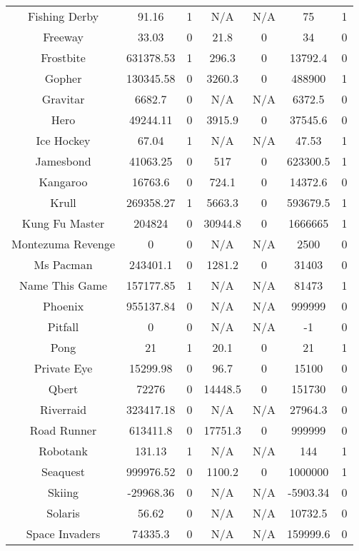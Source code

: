 \begin{table}[!hb]
\begin{center}
\begin{tabular}{c cc cc cc}
        Fishing Derby & 91.16 & 1  & N/A & N/A & 75 & 1  \\  
        Freeway & 33.03 & 0  & 21.8 & 0  & 34 & 0  \\  
        Frostbite & 631378.53 & 1  & 296.3 & 0  & 13792.4 & 0  \\  
        Gopher & 130345.58 & 0  & 3260.3 & 0  & 488900 & 1  \\  
        Gravitar & 6682.7 & 0  & N/A & N/A & 6372.5 & 0  \\  
        Hero & 49244.11 & 0  & 3915.9 & 0  & 37545.6 & 0  \\  
        Ice Hockey & 67.04 & 1  & N/A & N/A & 47.53 & 1  \\  
        Jamesbond & 41063.25 & 0  & 517 & 0  & 623300.5 & 1  \\  
        Kangaroo & 16763.6 & 0  & 724.1 & 0  & 14372.6 & 0  \\  
        Krull & 269358.27 & 1  & 5663.3 & 0  & 593679.5 & 1  \\  
        Kung Fu Master & 204824 & 0  & 30944.8 & 0  & 1666665 & 1  \\  
        Montezuma Revenge & 0 & 0  & N/A & N/A & 2500 & 0  \\  
        Ms Pacman & 243401.1 & 0  & 1281.2 & 0  & 31403 & 0  \\  
        Name This Game & 157177.85 & 1  & N/A & N/A & 81473 & 1  \\  
        Phoenix & 955137.84 & 0  & N/A & N/A & 999999 & 0  \\  
        Pitfall & 0 & 0  & N/A & N/A & -1 & 0  \\  
        Pong & 21 & 1  & 20.1 & 0  & 21 & 1  \\  
        Private Eye & 15299.98 & 0  & 96.7 & 0  & 15100 & 0  \\  
        Qbert & 72276 & 0  & 14448.5 & 0  & 151730 & 0  \\  
        Riverraid & 323417.18 & 0  & N/A & N/A & 27964.3 & 0  \\  
        Road Runner & 613411.8 & 0  & 17751.3 & 0  & 999999 & 0  \\  
        Robotank & 131.13 & 1  & N/A & N/A & 144 & 1  \\  
        Seaquest & 999976.52 & 0  & 1100.2 & 0  & 1000000 & 1  \\  
        Skiing & -29968.36 & 0  & N/A & N/A & -5903.34 & 0  \\  
        Solaris & 56.62 & 0  & N/A & N/A & 10732.5 & 0  \\  
        Space Invaders & 74335.3 & 0  & N/A & N/A & 159999.6 & 0  \\  

\end{tabular}
\end{center}
\end{table}
